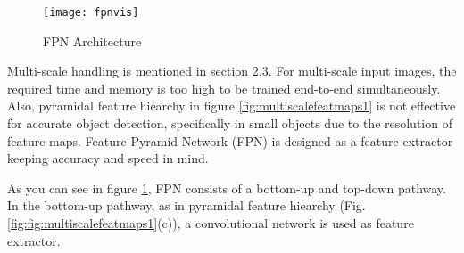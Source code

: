 \documentclass{article}
\begin{document}
\setlength{\parindent}{6ex}

\begin{figure}
    \centering
    \texttt{[image: fpnvis]}
    \caption{FPN Architecture}
    \label{fig:fpnvis1}
\end{figure}

\indent

Multi-scale handling is mentioned in section 2.3. For multi-scale input images, 
the required time and memory is too high to be trained end-to-end simultaneously. 
Also, pyramidal feature hiearchy in figure \ref{fig:multiscalefeatmaps1} is not 
effective for accurate object detection, specifically in small objects due to the 
resolution of feature maps. Feature Pyramid Network (FPN) is designed as a 
feature extractor keeping accuracy and speed in mind. \par 

As you can see in figure \ref{fig:fpnvis1}, FPN consists of a bottom-up and 
top-down pathway. In the bottom-up pathway, as in pyramidal feature hiearchy 
(Fig. \ref{fig:fig:multiscalefeatmaps1}(c)), a convolutional network is used as 
feature extractor. 
 
\end{document}
